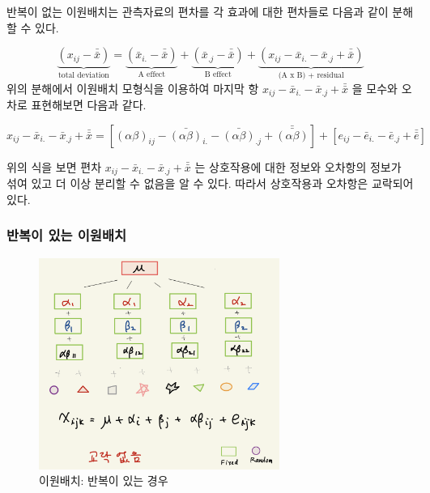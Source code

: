 \documentclass[
]{book}
\theoremstyle{definition}
\theoremstyle{definition}
\theoremstyle{definition}
\theoremstyle{remark}
\begin{document}
반복이 없는 이원배치는 관측자료의 편차를 각 효과에 대한 편차들로 다음과 같이 분해할 수 있다.

\[ 
 \underbrace{ ( {x}_{ij} - \bar{\bar {x}} )}_{\text{total deviation}}= \underbrace{( {\bar x}_{i.} - \bar{\bar {x}} ) }_{\text{A effect}} + \underbrace{( {\bar x}_{.j} - \bar{\bar {x}} ) }_{\text{B effect}} + \underbrace{ ( x_{ij} -{\bar x}_{i.} - {\bar x}_{.j} + \bar{\bar {x}}  )}_{\text{(A x B) + residual}} 
\]
위의 분해에서 이원배치 모형식을 이용하여 마지막 항 \(x_{ij} -{\bar x}_{i.} - {\bar x}_{.j} + \bar{\bar {x}}\) 을 모수와 오차로 표현해보면 다음과 같다.

\begin{equation}
x_{ij} -{\bar x}_{i.} - {\bar x}_{.j} + \bar{\bar {x}}  = 
[ (\alpha \beta)_{ij} - \bar {(\alpha \beta)}_{i. } -\bar {(\alpha \beta)}_{.j} + \bar {\bar {(\alpha \beta)}} ]  +
[ e_{ij} - \bar {e}_{i. } -\bar {e}_{.j} + \bar {\bar {e}}]
\label{eq:inter}
\end{equation}

위의 식을 보면 편차 \(x_{ij} -{\bar x}_{i.} - {\bar x}_{.j} + \bar{\bar {x}}\) 는 상호작용에 대한 정보와 오차항의 정보가 섞여 있고
더 이상 분리할 수 없음을 알 수 있다. 따라서 상호작용과 오차항은 교락되어 있다.

\hypertarget{uxbc18uxbcf5uxc774-uxc788uxb294-uxc774uxc6d0uxbc30uxce58}{%
\subsubsection{반복이 있는 이원배치}\label{uxbc18uxbcf5uxc774-uxc788uxb294-uxc774uxc6d0uxbc30uxce58}}

\begin{figure}
\centering
\includegraphics[width=0.7\textwidth,height=\textheight]{confound3.png}
\caption{이원배치: 반복이 있는 경우}
\end{figure}
\end{document}
